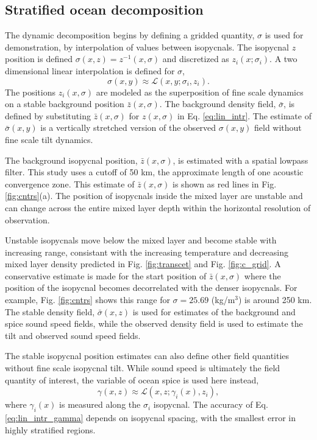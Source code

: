 \documentclass[preprint,NumberedRefs]{JASA}
\begin{document}
\subsection{Stratified ocean decomposition}
The dynamic decomposition begins by defining a gridded quantity, $\sigma$ is used for demonstration, by interpolation of values between isopycnals. The isopycnal $z$ position is defined $\sigma(x, z) = z^{-1}(x, \sigma)$ and discretized as $z_i(x; \sigma_i)$. A two dimensional linear interpolation is defined for $\sigma$,
\begin{equation}
    \sigma(x,y)\approx\mathcal{L}(x, y; \sigma_i, z_i).
    \label{eq:lin_intr}
\end{equation}
The positions $z_i(x, \sigma)$ are modeled as the superposition of fine scale dynamics on a stable background position $\bar{z}(x, \sigma)$. The background density field, $\bar{\sigma}$, is defined by substituting $\bar{z}(x, \sigma)$ for $z(x, \sigma)$ in Eq. \eqref{eq:lin_intr}. The estimate of $\bar{\sigma}(x,y)$ is a vertically stretched version of the observed $\sigma(x,y)$ field without fine scale tilt dynamics.

The background isopycnal position, $\bar{z}(x, \sigma)$, is estimated with a spatial lowpass filter. This study uses a cutoff of 50 km, the approximate length of one acoustic convergence zone\cite{jensen2011computational}. This estimate of $\bar{z}(x, \sigma)$ is shown as red lines in Fig. \ref{fig:cntrs}(a). The position of isopycnals inside the mixed layer are unstable and can change across the entire mixed layer depth within the horizontal resolution of observation. 

Unstable isopycnals move below the mixed layer and become stable with increasing range, consistant with the increasing temperature and decreasing mixed layer density predicted in Fig. \ref{fig:transcet} and Fig. \ref{fig:c_grid}. A conservative estimate is made for the start position of $\bar{z}(x, \sigma)$ where the position of the isopycnal becomes decorrelated with the denser isopycnals. For example, Fig. \ref{fig:cntrs} shows this range for $\sigma=25.69$ (kg/m$^3$) is around 250 km. The stable density field, $\bar{\sigma}(x,z)$ is used for estimates of the background and spice sound speed fields, while the observed density field is used to estimate the tilt and observed sound speed fields.

The stable isopycnal position estimates can also define other field quantities without fine scale isopycnal tilt. While sound speed is ultimately the field quantity of interest, the variable of ocean spice is used here instead,
\begin{equation}
    \gamma(x, z)\approx\mathcal{L}(x, z; \gamma_i(x), z_i),
    \label{eq:lin_intr_gamma}
\end{equation}
where $\gamma_i(x)$ is measured along the $\sigma_i$ isopycnal. The accuracy of Eq. \eqref{eq:lin_intr_gamma} depends on isopycnal spacing, with the smallest error in highly stratified regions.
\end{document}

